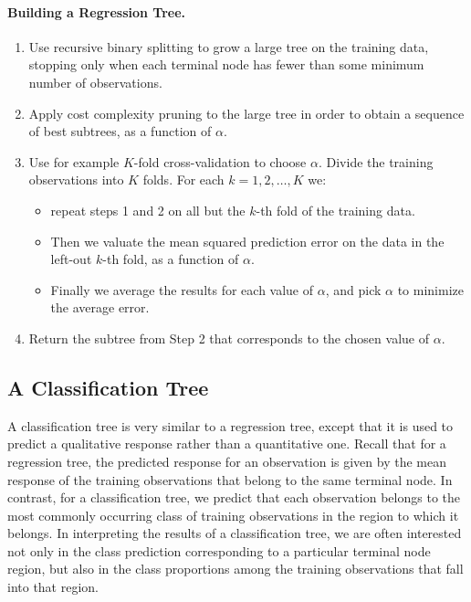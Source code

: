 \documentclass[%
oneside,                 %
final,                   %
10pt]{article}
\begin{document}
\paragraph{Building a Regression Tree.}
\begin{enumerate}
\item Use recursive binary splitting to grow a large tree on the training data, stopping only when each terminal node has fewer than some minimum number of observations.

\item Apply cost complexity pruning to the large tree in order to obtain a sequence of best subtrees, as a function of $\alpha$.

\item Use for example $K$-fold cross-validation to choose $\alpha$. Divide the training observations into $K$ folds. For each $k=1,2,\dots,K$ we: 
\begin{itemize}

  \item repeat steps 1 and 2 on all but the $k$-th fold of the training data. 

  \item Then we valuate the mean squared prediction error on the data in the left-out $k$-th fold, as a function of $\alpha$.

  \item Finally  we average the results for each value of $\alpha$, and pick $\alpha$ to minimize the average error.

\end{itemize}

\noindent
\item Return the subtree from Step 2 that corresponds to the chosen value of $\alpha$. 
\end{enumerate}

\noindent




\subsection{A Classification Tree}

A classification tree is very similar to a regression tree, except
that it is used to predict a qualitative response rather than a
quantitative one. Recall that for a regression tree, the predicted
response for an observation is given by the mean response of the
training observations that belong to the same terminal node. In
contrast, for a classification tree, we predict that each observation
belongs to the most commonly occurring class of training observations
in the region to which it belongs. In interpreting the results of a
classification tree, we are often interested not only in the class
prediction corresponding to a particular terminal node region, but
also in the class proportions among the training observations that
fall into that region.  
\end{document}
